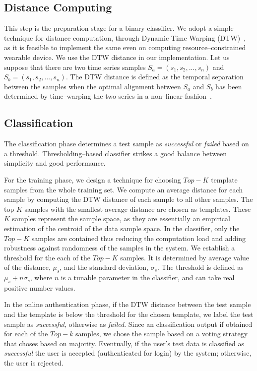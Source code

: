 \subsection{Distance Computing}
This step is the preparation stage for a binary classifier. We adopt a simple technique for distance computation, through Dynamic Time Warping (DTW)~\cite{dtw}, as it is feasible to implement the same even on computing resource--constrained wearable device. We use the DTW distance in our implementation. Let us suppose that there are two time series samples $S_a = (s_1,s_2, ... ,s_n)$ and $S_b = (s_1, s_2, ..., s_n)$. The DTW distance is defined as the temporal separation between  the samples when the optimal alignment between $S_a$ and $S_b$ has been determined by time--warping the two series in a non--linear fashion~\cite{dtw}.

\subsection{Classification}
The classification phase determines a test sample as \textit{successful} or \textit{failed} based on a threshold. Thresholding--based classifier strikes a good balance between simplicity and good performance. 

For the training phase, we design a technique for choosing $Top-K$ template samples from the whole training set. We compute an average distance for each sample by computing the DTW distance of each sample to all other samples. The top $K$ samples with the smallest average distance are chosen as templates. These $K$ samples represent the sample space, as they are essentially an empirical estimation of the centroid of the data sample space. In the classifier, only the $Top-K$ samples are contained thus reducing the computation load and adding robustness against randomness of the samples in the system. We establish a threshold for the each of the $Top-K$ samples. It is determined by average value of the distance, $\mu_s$, and the standard deviation, $\sigma_s$. The threshold is defined as $\mu_s + n\sigma_s$, where $n$ is a tunable parameter in the classifier, and can take real positive number values. 

In the online authentication phase, if the DTW distance between the test sample and the template is below the threshold for the chosen template, we label the test sample as {\em successful}, otherwise as {\em failed}. Since an classification output if obtained for each of the $Top-k$ samples, we chose the sample based on a voting strategy that choses based on majority.
Eventually, if the user's test data is classified as {\em successful} the user is accepted (authenticated for login) by the system; otherwise, the user is rejected. 



     